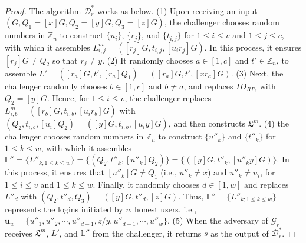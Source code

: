 \begin{proof}
  The algorithm $\mathcal{D}^*_r$ works as below. (1) Upon receiving an input $(G, Q_1=[x]G, Q_2=[y]G, Q_3=[z]G)$, %
  the challenger
  chooses random numbers in $\mathbb{Z}_n$ to construct $\{u_i\}$, $\{r_j\}$, and $\{t_{i, j}\}$ for $1 \le i \le v$ and $1 \le j \le c$, with which it assembles $L^m_{i, j}=([r_j]G, t_{i,j}, [u_ir_j]G)$.
  In this process, it ensures $[r_{j}]G \neq Q_2$ so that $r_j \neq y$.  %
  (2) It randomly chooses $a \in [1, c]$ and $t' \in \mathbb{Z}_n$, to assemble $L' = ([r_{a}]G, t', [r_{a}]Q_1) = ([r_{a}]G, t', [xr_{a}]G)$.
  (3)
  Next, the challenger randomly chooses $b \in [1, c]$ and $b \neq a$, and replaces $ID_{RP_b}$ with $Q_2 = [y]G$.
  Hence, for $1 \le i \le v$, the challenger replaces $L^m_{i, b}=([r_b]G, t_{i,b}, [u_ir_b]G)$ with $(Q_2, t_{i,b}, [u_i]Q_2) = ([y]G, t_{i,b}, [u_iy]G)$, and then constructs $\mathfrak{L}^m$.
  (4) the challenger chooses random numbers in $\mathbb{Z}_n$ to construct $\{u''_k\}$ and $\{t''_k\}$ for $1 \leq k \leq w$,
  with which it assembles $\mathbb{L}'' = \{L''_{k; 1\leq k \leq w}\} = \{(Q_2, t''_k, [u''_k]Q_2)\} = \{([y]G, t''_k, [u''_ky]G)\}$.
  In this process, it ensures that $[u''_k]G \neq Q_1$ (i.e., $u''_k \neq x$) and $u''_k \neq u_i$,
  for $1 \le i \le v$ and $1 \le k \le w$.
  Finally, it randomly chooses $d \in [1, w]$ and replaces $L''_{d}$ with $(Q_2, t''_d, Q_3) = ([y]G, t''_d, [z]G)$.
  Thus, $\mathbb{L}'' = \{L''_{k;1\leq k \leq w}\}$ represents the logins initiated by $w$ honest users, i.e., $\mathbf{u}_w=\{u''_1, u''_2, \cdots, u''_{d-1}, z/y, u''_{d+1}, \cdots, u''_w\}$.
  (5) When the adversary of $\mathcal{G}_r$ receives $\mathfrak{L}^m$, $L'$, and $\mathbb{L}''$ from the challenger, it returns $s$ as the output of $\mathcal{D}^*_r$.


\end{proof}
